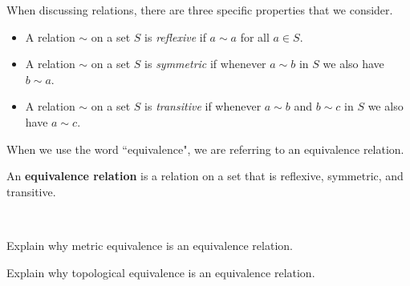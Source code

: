 When discussing relations, there are three specific properties that we consider.

\begin{itemize}
\item A relation $\sim$ on a set $S$ is \emph{reflexive} if $a \sim a$ for all $a \in S$.
\item A relation $\sim$ on a set $S$ is \emph{symmetric} if whenever $a \sim b$ in $S$ we also have $b \sim a$.
\item A relation $\sim$ on a set $S$ is \emph{transitive} if whenever $a \sim b$ and $b \sim c$ in $S$ we also have $a \sim c$.
\end{itemize}

When we use the word ``equivalence", we are referring to an equivalence relation.

\begin{definition} An \textbf{equivalence relation} is a relation on a set that is reflexive, symmetric, and transitive.  
\end{definition}


\begin{activity} ~
\ba
\item Explain why metric equivalence is an equivalence relation.

\item Explain why topological equivalence is an equivalence relation.

\ea

\end{activity}

